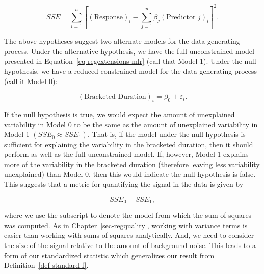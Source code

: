 \documentclass[
  letterpaper,
  DIV=11,
  numbers=noendperiod]{scrreprt}
\theoremstyle{plain}
\theoremstyle{definition}
\theoremstyle{definition}
\theoremstyle{remark}
\begin{document}
\[SSE = \sum_{i=1}^{n}\left[(\text{Response})_i - \sum_{j=1}^{p} \beta_j (\text{Predictor } j)_i\right]^2.\]

The above hypotheses suggest two alternate models for the data
generating process. Under the alternative hypothesis, we have the full
unconstrained model presented in Equation~\ref{eq-regextensions-mlr}
(call that Model 1). Under the null hypothesis, we have a reduced
constrained model for the data generating process (call it Model 0):

\[(\text{Bracketed Duration})_i = \beta_0 + \varepsilon_i.\]

If the null hypothesis is true, we would expect the amount of
unexplained variability in Model 0 to be the same as the amount of
unexplained variability in Model 1 \(\left(SSE_0 \approx SSE_1\right)\).
That is, if the model under the null hypothesis is sufficient for
explaining the variability in the bracketed duration, then it should
perform as well as the full unconstrained model. If, however, Model 1
explains more of the variability in the bracketed duration (therefore
leaving less variability unexplained) than Model 0, then this would
indicate the null hypothesis is false. This suggests that a metric for
quantifying the signal in the data is given by

\[SSE_0 - SSE_1,\]

where we use the subscript to denote the model from which the sum of
squares was computed. As in Chapter~\ref{sec-regquality}, working with
variance terms is easier than working with sums of squares analytically.
And, we need to consider the size of the signal relative to the amount
of background noise. This leads to a form of our standardized statistic
which generalizes our result from Definition~\ref{def-standard-f}.
\end{document}
